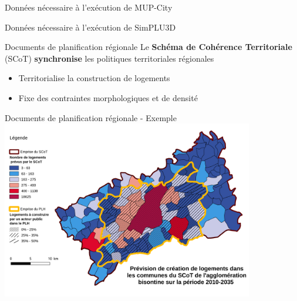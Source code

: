 \documentclass[xcolor=table]{beamer}
\begin{document}
\begin{frame}{Données nécessaire à l'exécution de MUP-City}
\end{frame}
\begin{frame}{Données nécessaire à l'exécution de SimPLU3D}
\end{frame}

\begin{frame}{Documents de planification régionale}
Le \textbf{Schéma de Cohérence Territoriale} (SCoT) \textbf{synchronise} les politiques territoriales régionales
\begin{itemize}
	\item Territorialise la construction de logements
	\item Fixe des contraintes morphologiques et de densité
\end{itemize}
\end{frame}

\begin{frame}{Documents de planification régionale - Exemple}
\includegraphics[width=11cm]{cartes/prevision-plh.png}
\end{frame}
\end{document}
